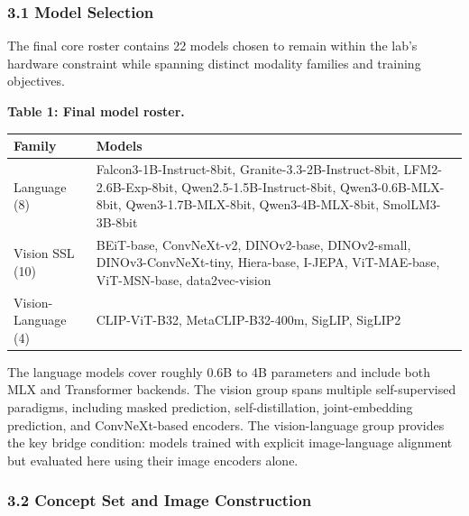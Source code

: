 \documentclass[
]{article}
\newcounter{none} %
\begin{document}
\subsubsection{3.1 Model Selection}\label{model-selection}

The final core roster contains 22 models chosen to remain within the
lab's hardware constraint while spanning distinct modality families and
training objectives.

\textbf{Table 1: Final model roster.}

{\def\LTcaptype{none} %
\begin{longtable}[]{@{}
  >{\raggedright\arraybackslash}p{}
  >{\raggedright\arraybackslash}p{}@{}}
\toprule\noalign{}
\begin{minipage}[b]{\linewidth}\raggedright
Family
\end{minipage} & \begin{minipage}[b]{\linewidth}\raggedright
Models
\end{minipage} \\
\midrule\noalign{}
\endhead
\bottomrule\noalign{}
\endlastfoot
Language (8) & Falcon3-1B-Instruct-8bit, Granite-3.3-2B-Instruct-8bit,
LFM2-2.6B-Exp-8bit, Qwen2.5-1.5B-Instruct-8bit, Qwen3-0.6B-MLX-8bit,
Qwen3-1.7B-MLX-8bit, Qwen3-4B-MLX-8bit, SmolLM3-3B-8bit \\
Vision SSL (10) & BEiT-base, ConvNeXt-v2, DINOv2-base, DINOv2-small,
DINOv3-ConvNeXt-tiny, Hiera-base, I-JEPA, ViT-MAE-base, ViT-MSN-base,
data2vec-vision \\
Vision-Language (4) & CLIP-ViT-B32, MetaCLIP-B32-400m, SigLIP,
SigLIP2 \\
\end{longtable}
}

The language models cover roughly 0.6B to 4B parameters and include both
MLX and Transformer backends. The vision group spans multiple
self-supervised paradigms, including masked prediction,
self-distillation, joint-embedding prediction, and ConvNeXt-based
encoders. The vision-language group provides the key bridge condition:
models trained with explicit image-language alignment but evaluated here
using their image encoders alone.

\subsubsection{3.2 Concept Set and Image
Construction}\label{concept-set-and-image-construction}
\end{document}
